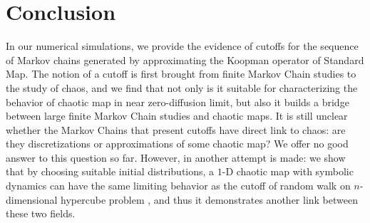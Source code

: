 %
%
\section{Conclusion}
\label{sec:numcutoffconclusion}
In our numerical simulations, we provide the evidence of cutoffs for the sequence of Markov chains generated by approximating the Koopman operator of Standard Map. The notion of a cutoff is first brought from finite Markov Chain studies to the study of chaos, and we find that not only is it suitable for characterizing the behavior of chaotic map in near zero-diffusion limit, but also it builds a bridge between large finite Markov Chain studies and chaotic maps. It is still unclear whether the Markov Chains that present cutoffs have direct link to chaos: are they discretizations or approximations of some chaotic map? We offer no good answer to this question so far. However, in \cite{symdyn} another attempt is made: we show that by choosing suitable initial distributions, a $1$-D chaotic map with symbolic dynamics can have the same limiting behavior as the cutoff of random walk on $n$-dimensional hypercube problem \cite{Diaconis1990}, and thus it demonstrates another link between these two fields.
